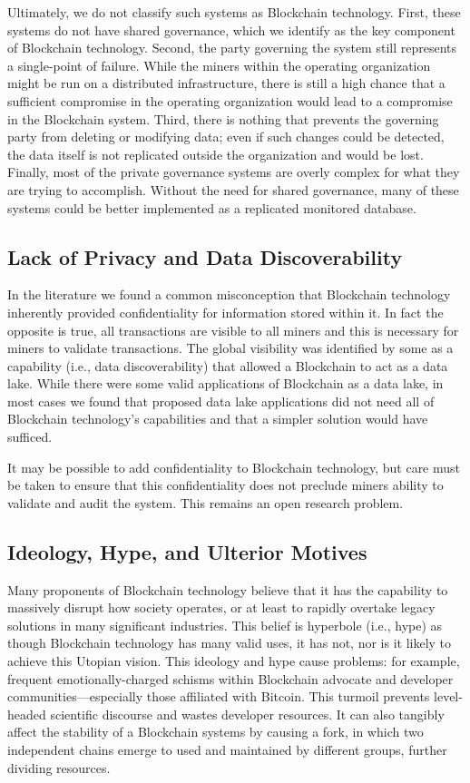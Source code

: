 Ultimately, we do not classify such systems as Blockchain technology.
First, these systems do not have shared governance, which we identify as the key component of Blockchain technology.
Second, the party governing the system still represents a single-point of failure.
While the miners within the operating organization might be run on a distributed infrastructure, there is still a high chance that a sufficient compromise in the operating organization would lead to a compromise in the Blockchain system.
Third, there is nothing that prevents the governing party from deleting or modifying data; even if such changes could be detected, the data itself is not replicated outside the organization and would be lost.
Finally, most of the private governance systems are overly complex for what they are trying to accomplish.
Without the need for shared governance, many of these systems could be better implemented as a replicated monitored database.

\subsection{Lack of Privacy and Data Discoverability}
In the literature we found a common misconception that Blockchain technology inherently provided confidentiality for information stored within it.
In fact the opposite is true, all transactions are visible to all miners and this is necessary for miners to validate transactions.
The global visibility was identified by some as a capability (i.e., data discoverability) that allowed a Blockchain to act as a data lake.
While there were some valid applications of Blockchain as a data lake, in most cases we found that proposed data lake applications did not need all of Blockchain technology's capabilities and that a simpler solution would have sufficed.

It may be possible to add confidentiality to Blockchain technology, but care must be taken to ensure that this confidentiality does not preclude miners ability to validate and audit the system.
This remains an open research problem.

\subsection{Ideology, Hype, and Ulterior Motives}
Many proponents of Blockchain technology believe that it has the capability to massively disrupt how society operates, or at least to rapidly overtake legacy solutions in many significant industries. This belief is hyperbole (i.e., hype) as though Blockchain technology has many valid uses, it has not, nor is it likely to achieve this Utopian vision. This ideology and hype cause problems: for example, frequent emotionally-charged schisms within Blockchain advocate and developer communities---especially those affiliated with Bitcoin. This turmoil prevents level-headed scientific discourse and wastes developer resources. It can also tangibly affect the stability of a Blockchain systems by causing a fork, in which two independent chains emerge to used and maintained by different groups, further dividing resources.

